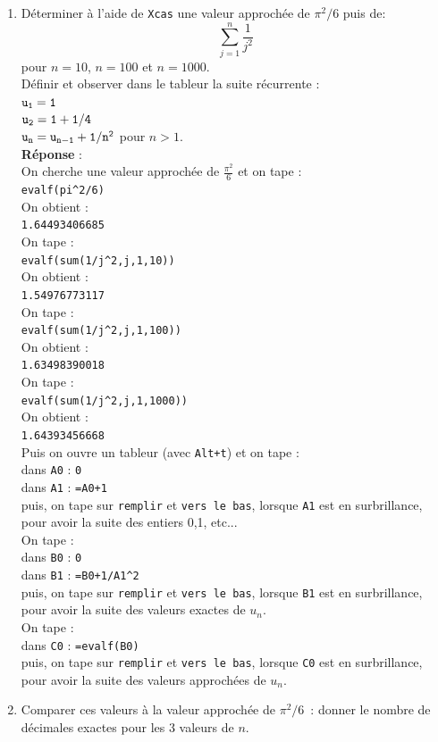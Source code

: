 \documentclass[a4paper,11pt]{book}
\begin{document}
\begin{enumerate}
\item D\'eterminer \`a l'aide de {\tt Xcas} une valeur approch\'ee de
$\pi^2/6$ puis de:
\[ \sum _{j=1}^{n} \frac{1}{j^2} \]
pour $n=10$, $n=100$ et $n=1000$.\\
D\'efinir et observer dans le tableur la suite r\'ecurrente :\\
${\tt  u_1=1}$\\
${\tt u_2=1+1/4}$\\
${\tt u_n=u_{n-1}+1/n^2} $ pour $n>1$.\\
{\bf R\'eponse} :\\
On cherche une valeur approch\'ee de $\frac{\pi^2}{6}$ et on tape :\\
{\tt evalf(pi\verb|^|2/6)}\\
On obtient :\\
{\tt 1.64493406685}\\
On tape :\\
{\tt evalf(sum(1/j\verb|^|2,j,1,10))}\\
On obtient :\\
{\tt 1.54976773117}\\
On tape :\\
{\tt evalf(sum(1/j\verb|^|2,j,1,100))}\\
On obtient :\\
{\tt 1.63498390018}\\
On tape :\\
{\tt evalf(sum(1/j\verb|^|2,j,1,1000))}\\
On obtient :\\
{\tt 1.64393456668}\\
Puis on  ouvre un tableur (avec {\tt Alt+t}) et on tape :\\
 dans {\tt A0} : {\tt 0}\\ 
 dans {\tt A1} : {\tt =A0+1}\\
puis, on tape sur {\tt remplir}  et {\tt vers le bas}, lorsque {\tt A1} est en 
surbrillance,
pour avoir la suite des entiers 0,1, etc...\\
On tape :\\
dans {\tt B0} : {\tt 0} \\ 
dans {\tt B1} : {\tt =B0+1/A1\verb|^|2}\\
puis, on tape sur {\tt remplir}  et {\tt vers le bas}, lorsque {\tt B1} est en 
surbrillance,
pour avoir la suite des valeurs exactes de $u_n$.\\
On tape :\\
dans {\tt C0} : {\tt =evalf(B0)}\\ 
puis, on tape sur {\tt remplir} et {\tt vers le bas}, lorsque {\tt C0} est en
 surbrillance,
pour avoir la suite des valeurs approch\'ees de $u_n$.\\
\item 
Comparer ces valeurs \`a la valeur approch\'ee de $\pi^2/6$~: donner
le nombre de d\'ecimales exactes pour les 3 valeurs de $n$.


\end{enumerate}
\end{document}

